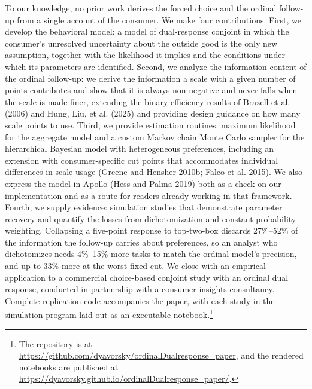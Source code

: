 \documentclass[
  letterpaper,
  DIV=11,
  numbers=noendperiod]{scrartcl}
\theoremstyle{plain}
\theoremstyle{plain}
\theoremstyle{plain}
\theoremstyle{remark}
\begin{document}
To our knowledge, no prior work derives the forced choice and the
ordinal follow-up from a single account of the consumer. We make four
contributions. First, we develop the behavioral model: a model of
dual-response conjoint in which the consumer's unresolved uncertainty
about the outside good is the only new assumption, together with the
likelihood it implies and the conditions under which its parameters are
identified. Second, we analyze the information content of the ordinal
follow-up: we derive the information a scale with a given number of
points contributes and show that it is always non-negative and never
falls when the scale is made finer, extending the binary efficiency
results of Brazell et al. (2006) and Hung, Liu, et al. (2025) and
providing design guidance on how many scale points to use. Third, we
provide estimation routines: maximum likelihood for the aggregate model
and a custom Markov chain Monte Carlo sampler for the hierarchical
Bayesian model with heterogeneous preferences, including an extension
with consumer-specific cut points that accommodates individual
differences in scale usage (Greene and Hensher 2010b; Falco et al.
2015). We also express the model in Apollo (Hess and Palma 2019) both as
a check on our implementation and as a route for readers already working
in that framework. Fourth, we supply evidence: simulation studies that
demonstrate parameter recovery and quantify the losses from
dichotomization and constant-probability weighting. Collapsing a
five-point response to top-two-box discards 27\%--52\% of the
information the follow-up carries about preferences, so an analyst who
dichotomizes needs 4\%--15\% more tasks to match the ordinal model's
precision, and up to 33\% more at the worst fixed cut. We close with an
empirical application to a commercial choice-based conjoint study with
an ordinal dual response, conducted in partnership with a consumer
insights consultancy. Complete replication code accompanies the paper,
with each study in the simulation program laid out as an executable
notebook.\footnote{The repository is at
  \url{https://github.com/dyavorsky/ordinalDualresponse_paper}, and the
  rendered notebooks are published at
  \url{https://dyavorsky.github.io/ordinalDualresponse_paper/}.}
\end{document}
